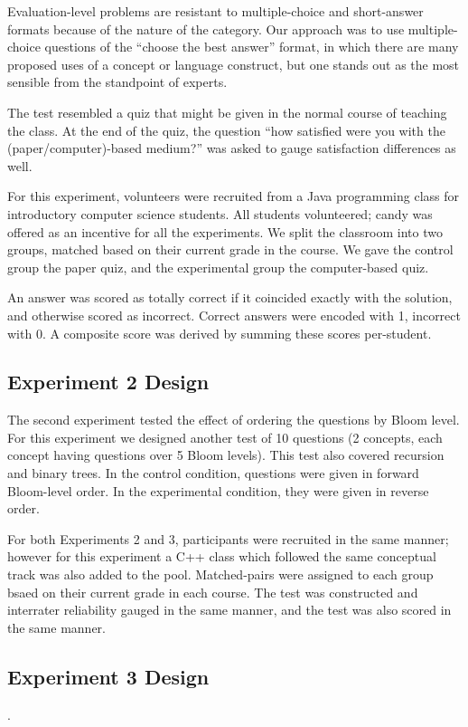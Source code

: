 Evaluation-level problems are resistant to multiple-choice and short-answer
formats because of the nature of the category.  Our approach was to use
multiple-choice questions of the ``choose the best answer'' format, in which
there are many proposed uses of a concept or language construct, but one stands
out as the most sensible from the standpoint of experts. 

The test resembled a quiz that might be given in the normal course of teaching
the class. At the end of the quiz, the question ``how satisfied were you with
the (paper/computer)-based medium?'' was asked to gauge satisfaction
differences as well.

For this experiment, volunteers were recruited from a Java programming class
for introductory computer science students.  All students volunteered; candy
was offered as an incentive for all the experiments.  We split the classroom
into two groups, matched based on their current grade in the course.  We gave
the control group the paper quiz, and the experimental group the computer-based
quiz.

An answer was scored as totally correct if it coincided exactly with the
solution, and otherwise scored as incorrect. Correct answers were encoded with
1, incorrect with 0.  A composite score was derived by summing these scores
per-student.

\subsection{Experiment 2 Design}

The second experiment tested the effect of ordering the questions by Bloom
level.  For this experiment we designed another test of 10 questions (2
concepts, each concept having questions over 5 Bloom levels).  This test also
covered recursion and binary trees. In the control condition, questions were
given in forward Bloom-level order.  In the experimental condition, they were
given in reverse order.

For both Experiments 2 and 3, participants were recruited in the same manner;
however for this experiment a C++ class which followed the same conceptual
track was also added to the pool. Matched-pairs were assigned to each group
bsaed on their current grade in each course.  The test was constructed and
interrater reliability gauged in the same manner, and the test was also scored
in the same manner.

\subsection{Experiment 3 Design}. 

